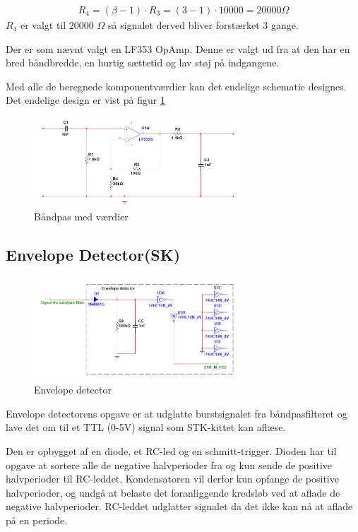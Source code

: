\begin{align}
R_4 = (\beta - 1) \cdot R_3 = (3 - 1) \cdot 10000 = 20000 \Omega
\end{align} 
$R_4$ er valgt til 20000 $\Omega$ så signalet derved bliver forstærket 3 gange.

Der er som nævnt valgt en LF353 OpAmp. Denne er valgt ud fra at den har en bred båndbredde, en hurtig sættetid og lav støj på indgangene. 

Med alle de beregnede komponentværdier kan det endelige schematic designes. Det endelige design er vist på figur \ref{fig:BAANDPAS_MV} 

\begin{figure}[htbp]
	\centering
	\includegraphics[width=0.70\textwidth]{billeder/HWdesign/BAANDPAS_MV.png}
	\caption{Båndpas med værdier}
	\label{fig:BAANDPAS_MV}
\end{figure}
 

\newpage

\subsection{Envelope Detector(SK)}

\begin{figure}[htbp]
	\centering
	\includegraphics[width=0.70\textwidth]{billeder/HWdesign/ED_MV.png}
	\caption{Envelope detector}
	\label{fig:ED_MV}
\end{figure}

Envelope detectorens opgave er at udglatte burstsignalet fra båndpasfilteret og lave det om til et TTL (0-5V) signal som STK-kittet kan aflæse.

Den er opbygget af en diode, et RC-led og en schmitt-trigger. Dioden har til opgave at sortere alle de negative halvperioder fra og kun sende de positive halvperioder til RC-leddet. Kondensatoren vil derfor kun opfange de positive halvperioder, og undgå at belaste det foranliggende kredsløb ved at aflade de negative halvperioder. RC-leddet udglatter signalet da det ikke kan nå at aflade på en periode.


